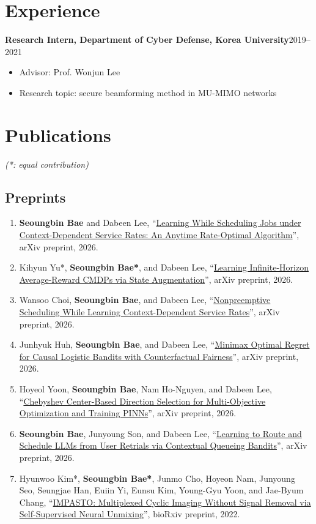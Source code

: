 \documentclass[10pt]{article}
\newcommand{\pub}[1]{\item #1}
\newcommand{\cvtitle}[1]{\uline{#1}}
\begin{document}
\section*{Experience}
\textbf{Research Intern, Department of Cyber Defense, Korea University}\hfill 2019--2021
\begin{itemize}
  \item Advisor: Prof. Wonjun Lee
  \item Research topic: secure beamforming method in MU-MIMO networks
\end{itemize}

\section*{Publications}
\textit{(*: equal contribution)}

\subsection*{Preprints}
\begin{enumerate}
  \pub{\textbf{Seoungbin Bae} and Dabeen Lee, ``\cvtitle{Learning While Scheduling Jobs under Context-Dependent Service Rates: An Anytime Rate-Optimal Algorithm}'', arXiv preprint, 2026.}
  \pub{Kihyun Yu*, \textbf{Seoungbin Bae*}, and Dabeen Lee, ``\cvtitle{Learning Infinite-Horizon Average-Reward CMDPs via State Augmentation}'', arXiv preprint, 2026.}
  \pub{Wansoo Choi, \textbf{Seoungbin Bae}, and Dabeen Lee, ``\cvtitle{Nonpreemptive Scheduling While Learning Context-Dependent Service Rates}'', arXiv preprint, 2026.}
  \pub{Junhyuk Huh, \textbf{Seoungbin Bae}, and Dabeen Lee, ``\cvtitle{Minimax Optimal Regret for Causal Logistic Bandits with Counterfactual Fairness}'', arXiv preprint, 2026.}
  \pub{Hoyeol Yoon, \textbf{Seoungbin Bae}, Nam Ho-Nguyen, and Dabeen Lee, ``\cvtitle{Chebyshev Center-Based Direction Selection for Multi-Objective Optimization and Training PINNs}'', arXiv preprint, 2026.}
  \pub{\textbf{Seoungbin Bae}, Junyoung Son, and Dabeen Lee, ``\cvtitle{Learning to Route and Schedule LLMs from User Retrials via Contextual Queueing Bandits}'', arXiv preprint, 2026.}
  \pub{Hyunwoo Kim*, \textbf{Seoungbin Bae*}, Junmo Cho, Hoyeon Nam, Junyoung Seo, Seungjae Han, Euiin Yi, Eunsu Kim, Young-Gyu Yoon, and Jae-Byum Chang, ``\cvtitle{IMPASTO: Multiplexed Cyclic Imaging Without Signal Removal via Self-Supervised Neural Unmixing}'', bioRxiv preprint, 2022.}
\end{enumerate}
\end{document}

